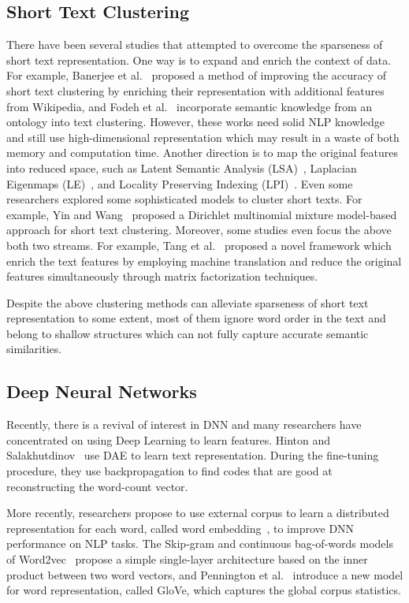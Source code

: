 \documentclass[review]{elsarticle}
\begin{document}
\subsection{Short Text Clustering}
There have been several studies that attempted to overcome the sparseness of short text representation. One way is to expand and enrich the context of data. For example, Banerjee et al.~\cite{29_banerjee2007clustering} proposed a method of improving the accuracy of short text clustering by enriching their representation with additional features from Wikipedia, and Fodeh et al.~\cite{33_fodeh2011ontology} incorporate semantic knowledge from an ontology into text clustering. However, these works need solid NLP knowledge and still use high-dimensional representation which may result in a waste of both memory and
computation time. Another direction is to map the original features into reduced space, such as Latent Semantic Analysis (LSA)~\cite{deerwester1990indexing}, Laplacian Eigenmaps (LE)~\cite{37_ng2002spectral}, and Locality Preserving Indexing (LPI)~\cite{niyogi2004locality}. Even some researchers explored some sophisticated models to cluster short texts. For example, Yin and Wang~\cite{30_yin2014dirichlet} proposed a Dirichlet multinomial mixture model-based approach for short text clustering. Moreover, some studies even focus the above both two streams. For example, Tang et al.~\cite{32_tang2012enriching} proposed a novel framework which enrich the text features by employing machine translation and reduce the original features simultaneously through matrix factorization techniques.

Despite the above clustering methods can alleviate sparseness of short text representation to some extent, most of them ignore word order in the text and belong to shallow structures which can not fully capture accurate semantic similarities.


\subsection{Deep Neural Networks}
Recently, there is a revival of interest in DNN and many researchers have concentrated on using Deep Learning to learn features. Hinton and Salakhutdinov~\cite{23_hinton2006reducing} use DAE to learn text representation. During the fine-tuning procedure, they use backpropagation to find codes that are good at reconstructing the word-count vector.

More recently, researchers propose to use external corpus to learn a distributed representation for each word, called word embedding~\cite{25_turian2010word}, to improve DNN performance on NLP tasks. The Skip-gram and continuous bag-of-words models of Word2vec~\cite{21_mikolov2013distributed} propose a simple single-layer architecture based on the inner product between two word vectors, and Pennington et al.~\cite{26_pennington2014glove} introduce a new model for word representation, called GloVe, which captures the global corpus statistics.
\end{document}
